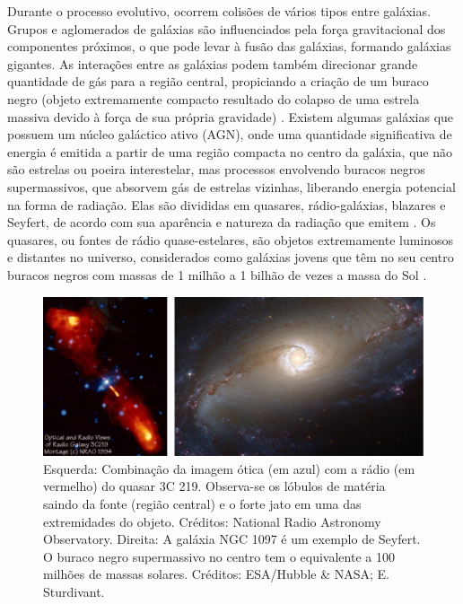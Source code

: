 Durante o processo evolutivo, ocorrem colisões de vários tipos entre galáxias. Grupos e aglomerados de galáxias são influenciados pela força gravitacional dos componentes próximos, o que pode levar à fusão das galáxias, formando galáxias gigantes. As interações entre as galáxias podem também direcionar grande quantidade de gás para a região central, propiciando a criação de um buraco negro (objeto extremamente compacto resultado do colapso de uma estrela massiva devido à força de sua própria gravidade) \cite{2003Wuensche}. Existem algumas galáxias que possuem um núcleo galáctico ativo (AGN), onde uma quantidade significativa de energia é emitida a partir de uma região compacta no centro da galáxia, que não são estrelas ou poeira interestelar, mas processos envolvendo buracos negros supermassivos, que absorvem gás de estrelas vizinhas, liberando energia potencial na forma de radiação. Elas são divididas em quasares, rádio-galáxias, blazares e Seyfert, de acordo com sua aparência e natureza da radiação que emitem \cite{2022gastao}. Os quasares, ou fontes de rádio quase-estelares, são objetos extremamente luminosos e distantes no universo, considerados como galáxias jovens que têm no seu centro buracos negros com massas de 1 milhão a 1 bilhão de vezes a massa do Sol \cite{2023Muller}.

\begin{figure}[!h] 
  \centering 
  \includegraphics[width=1.0\textwidth]{Imagens/agns.png} 
  \caption[Exemplos de galáxias com núcleo ativo.]{Esquerda: Combinação da imagem ótica (em azul) com a rádio (em vermelho) do quasar 3C 219. Observa-se os lóbulos de matéria saindo da fonte (região central) e o forte jato em uma das extremidades do objeto. Créditos: National Radio Astronomy Observatory. Direita: A galáxia NGC 1097 é um exemplo de Seyfert. O buraco negro supermassivo no centro tem o equivalente a 100 milhões de massas solares. Créditos: ESA/Hubble \& NASA; E. Sturdivant.}
  \label{fig:} 
\end{figure}

